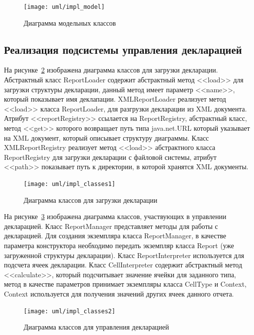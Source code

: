 \documentclass[14pt,a4paper]{reportmod}
\begin{document}
\begin{figure}
  \centering
  \texttt{[image: uml/impl\_model]}
  \caption{Диаграмма модельных классов}
  \label{pic:model_classes}
\end{figure}

\subsection{Реализация подсистемы управления декларацией}

На рисунке~\ref{pic:loadclasses} изображена диаграмма классов для загрузки декларации. Абстрактный класс ReportLoader содержит абстрактный метод <<load>> для загрузки структуры декларации, данный метод имеет параметр <<name>>, который показывает имя деклапации. XMLReportLoader реализует метод <<load>> класса ReportLoader, для разгрузки декларации из XML документа. Атрибут <<reportRegistry>> ссылается на ReportRegistry, абстрактный класс, метод <<get>> которого возвращает путь типа java.net.URL который указывает на XML документ, который описывает структуру диаграммы. Класс XMLReportRegistry реализует метод <<load>> абстрактного класса ReportRegistry для загрузки декларации с файловой системы, атрибут <<path>> показывает путь к директории, в которой хранятся XML документы.

\begin{figure}
  \centering
  \texttt{[image: uml/impl\_classes1]}
  \caption{Диаграмма классов для загрузки декларации}
  \label{pic:loadclasses}
\end{figure}

На рисунке~\ref{pic:reportmanager} изображена диаграмма классов, участвующих в управлении декларацией. Класс ReportManager представляет методы для работы с декларацией. Для создания экземпляра класса ReportManager, в качестве параметра конструктора необходимо передать экземпляр класса Report (уже загруженной структуры декларации). Класс ReportInterpreter используется для подсчета ячеек декларации. Класс CellInterpreter содержит абстрактный метод <<calculate>>, который подсчитывает значение ячейки для заданного типа, метод в качестве параметров принимает экземпляры класса CellType и Context, Context используется для получения значений других ячеек данного отчета.

\begin{figure}
  \centering
  \texttt{[image: uml/impl\_classes2]}
  \caption{Диаграмма классов для управления декларацией}
  \label{pic:reportmanager}
\end{figure}
\end{document}
